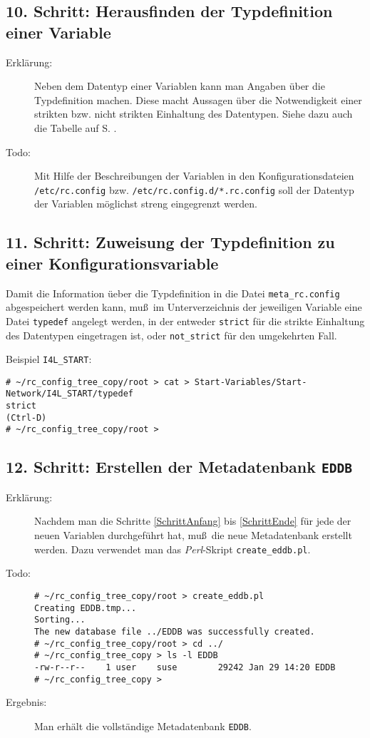 \documentclass[pdftex,titlepage,10pt]{article}
\begin{document}
\subsection*{10. Schritt: Herausfinden der Typdefinition einer Variable}
\begin{description}
\item[Erkl\"arung:] Neben dem Datentyp einer Variablen kann man Angaben \"uber
  die Typdefinition machen. Diese macht Aussagen \"uber die Notwendigkeit einer
  strikten bzw. nicht strikten Einhaltung des Datentypen. Siehe dazu auch die
  Tabelle auf S. \pageref{tabelle}.
\item[Todo:] Mit Hilfe der Beschreibungen der Variablen in den Konfigurationsdateien
  {\tt /etc/rc.config} bzw. {\tt /etc/rc.config.d/*.rc.config} soll der Datentyp
  der Variablen m\"oglichst streng eingegrenzt werden.
\end{description}
\subsection*{11. Schritt: Zuweisung der Typdefinition zu einer Konfigurationsvariable}
\begin{description}\label{SchrittEnde}
\item[Erkl\"arung:] Damit die Information \"ueber die Typdefinition in
  die Datei {\tt meta\_rc.config} abgespeichert werden kann, mu\ss \ im 
  Unterverzeichnis der jeweiligen Variable eine Datei {\tt typedef} angelegt
  werden, in der entweder {\tt strict} f\"ur die strikte Einhaltung des Datentypen
  eingetragen ist, oder {\tt not\_strict} f\"ur den umgekehrten Fall.
\item[Todo:] Beispiel {\tt I4L\_START}:
{\footnotesize\begin{verbatim}
# ~/rc_config_tree_copy/root > cat > Start-Variables/Start-Network/I4L_START/typedef
strict
(Ctrl-D)
# ~/rc_config_tree_copy/root >
\end{verbatim}}
\end{description}
\subsection*{12. Schritt: Erstellen der Metadatenbank {\tt EDDB}}
\begin{description}
\item[Erkl\"arung:] Nachdem man die Schritte \ref{SchrittAnfang} bis
  \ref{SchrittEnde} f\"ur jede der neuen Variablen durchgef\"uhrt hat, mu\ss \ die
  neue Metadatenbank erstellt werden. Dazu verwendet man das {\em Perl}-Skript
  {\tt create\_eddb.pl}.
\item[Todo:]
{\footnotesize\begin{verbatim}
# ~/rc_config_tree_copy/root > create_eddb.pl
Creating EDDB.tmp...
Sorting...
The new database file ../EDDB was successfully created.
# ~/rc_config_tree_copy/root > cd ../
# ~/rc_config_tree_copy > ls -l EDDB
-rw-r--r--    1 user    suse        29242 Jan 29 14:20 EDDB
# ~/rc_config_tree_copy > 
\end{verbatim}}
\item[Ergebnis:] Man erh\"alt die vollst\"andige Metadatenbank {\tt EDDB}.
\end{description}
\end{document}
